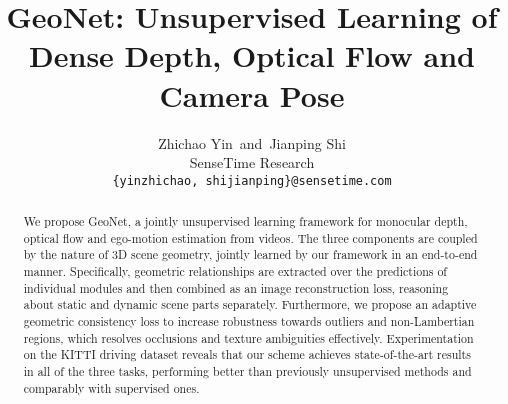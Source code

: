 \documentclass[10pt,twocolumn,letterpaper]{article}
\begin{document}
\title{GeoNet: Unsupervised Learning of Dense Depth, Optical Flow and Camera Pose}

\author{Zhichao Yin~and~Jianping Shi\\
SenseTime Research\\
{\tt\small \{yinzhichao, shijianping\}@sensetime.com}
}

\maketitle

\begin{abstract}
We propose GeoNet, a jointly unsupervised learning framework for monocular depth, optical flow and ego-motion estimation from videos. 
The three components are coupled by the nature of 3D scene geometry, jointly learned by our framework in an end-to-end manner. %
Specifically, geometric relationships are extracted over the predictions of individual modules and then combined as an image reconstruction loss,  reasoning about static and dynamic scene parts separately. Furthermore, we propose an adaptive geometric consistency loss to increase robustness towards outliers and non-Lambertian regions, which resolves occlusions and texture ambiguities effectively. 
Experimentation on the KITTI driving dataset reveals that our scheme achieves state-of-the-art results in all of the three tasks, performing better than previously unsupervised methods and comparably with supervised ones.
\end{abstract}
\end{document}
